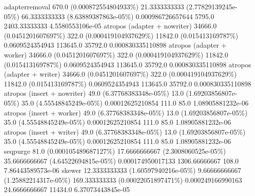 adapterremoval	670.0 (0.000872554804933\%)	21.3333333333 (2.77829139245e-05\%)	66.3333333333 (8.63889387863e-05\%)	0.000986726657644	5795.0	2403.33333333	4.5580553106e-05
atropos (adapter + nowriter)	34666.0 (0.0451201607697\%)	322.0 (0.000419104937629\%)	11842.0 (0.015413169787\%)	0.0609524354943	113645.0	35792.0	0.000830335110898
atropos (adapter + worker)	34666.0 (0.0451201607697\%)	322.0 (0.000419104937629\%)	11842.0 (0.015413169787\%)	0.0609524354943	113645.0	35792.0	0.000830335110898
atropos (adapter + writer)	34666.0 (0.0451201607697\%)	322.0 (0.000419104937629\%)	11842.0 (0.015413169787\%)	0.0609524354943	113645.0	35792.0	0.000830335110898
atropos (insert + nowriter)	49.0 (6.37768383348e-05\%)	13.0 (1.69203856807e-05\%)	35.0 (4.55548845249e-05\%)	0.00012625210854	111.0	85.0	1.08905881232e-06
atropos (insert + worker)	49.0 (6.37768383348e-05\%)	13.0 (1.69203856807e-05\%)	35.0 (4.55548845249e-05\%)	0.00012625210854	111.0	85.0	1.08905881232e-06
atropos (insert + writer)	49.0 (6.37768383348e-05\%)	13.0 (1.69203856807e-05\%)	35.0 (4.55548845249e-05\%)	0.00012625210854	111.0	85.0	1.08905881232e-06
seqpurge	81.0 (0.000105489687127\%)	17.6666666667 (2.3008060525e-05\%)	35.6666666667 (4.64522694815e-05\%)	0.000174950017133	1306.66666667	108.0	7.86443589573e-06
skewer	12.3333333333 (1.60597940216e-05\%)	9.66666666667 (1.25882214317e-05\%)	169.333333333 (0.00022051897471\%)	0.000249166990163	24.6666666667	11434.0	6.37073443845e-05 